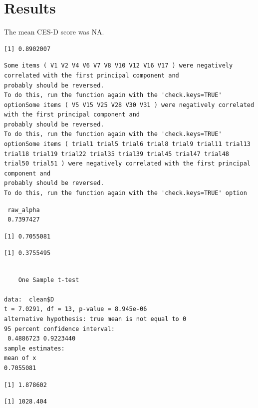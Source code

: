 \documentclass[
]{article}
\begin{document}
\section{Results}\label{results}

The mean CES-D score was NA.

\begin{verbatim}
[1] 0.8902007
\end{verbatim}

\begin{verbatim}
Some items ( V1 V2 V4 V6 V7 V8 V10 V12 V16 V17 ) were negatively correlated with the first principal component and 
probably should be reversed.  
To do this, run the function again with the 'check.keys=TRUE' optionSome items ( V5 V15 V25 V28 V30 V31 ) were negatively correlated with the first principal component and 
probably should be reversed.  
To do this, run the function again with the 'check.keys=TRUE' optionSome items ( trial1 trial5 trial6 trial8 trial9 trial11 trial13 trial18 trial19 trial22 trial35 trial39 trial45 trial47 trial48 trial50 trial51 ) were negatively correlated with the first principal component and 
probably should be reversed.  
To do this, run the function again with the 'check.keys=TRUE' option
\end{verbatim}

\begin{verbatim}
 raw_alpha
 0.7397427
\end{verbatim}

\begin{verbatim}
[1] 0.7055081
\end{verbatim}

\begin{verbatim}
[1] 0.3755495
\end{verbatim}

\begin{verbatim}

    One Sample t-test

data:  clean$D
t = 7.0291, df = 13, p-value = 8.945e-06
alternative hypothesis: true mean is not equal to 0
95 percent confidence interval:
 0.4886723 0.9223440
sample estimates:
mean of x 
0.7055081 
\end{verbatim}

\begin{verbatim}
[1] 1.878602
\end{verbatim}

\begin{verbatim}
[1] 1028.404
\end{verbatim}
\end{document}
